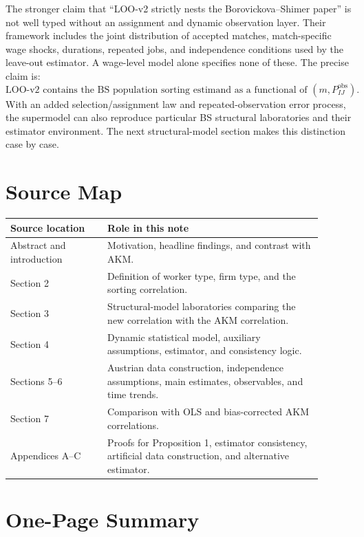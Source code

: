 \documentclass[11pt]{article}
\begin{document}
The stronger claim that ``LOO-v2 strictly nests the Borovickova--Shimer paper''
is not well typed without an assignment and dynamic observation layer.  Their
framework includes the joint distribution of accepted matches, match-specific
wage shocks, durations, repeated jobs, and independence conditions used by the
leave-out estimator.  A wage-level model alone specifies none of these.  The
precise claim is:
\[
\boxed{
\text{LOO-v2 contains the BS population sorting estimand as a functional of }
(m,P_{IJ}^{\mathrm{obs}}).}
\]
With an added selection/assignment law and repeated-observation error process,
the supermodel can also reproduce particular BS structural laboratories and
their estimator environment.  The next structural-model section makes this
distinction case by case.

\section*{Source Map}

\begin{center}
\begin{tabular}{>{\raggedright\arraybackslash}p{0.28\linewidth}p{0.62\linewidth}}
\toprule
Source location & Role in this note \\
\midrule
Abstract and introduction & Motivation, headline findings, and contrast with AKM. \\
Section 2 & Definition of worker type, firm type, and the sorting correlation. \\
Section 3 & Structural-model laboratories comparing the new correlation with the AKM correlation. \\
Section 4 & Dynamic statistical model, auxiliary assumptions, estimator, and consistency logic. \\
Sections 5--6 & Austrian data construction, independence assumptions, main estimates, observables, and time trends. \\
Section 7 & Comparison with OLS and bias-corrected AKM correlations. \\
Appendices A--C & Proofs for Proposition 1, estimator consistency, artificial data construction, and alternative estimator. \\
\bottomrule
\end{tabular}
\end{center}

\section{One-Page Summary}
\end{document}
